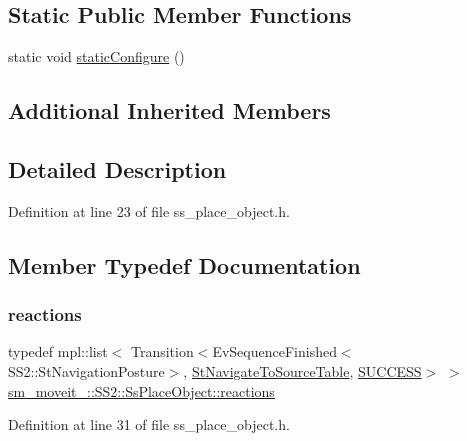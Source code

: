 \subsection*{Static Public Member Functions}
\begin{DoxyCompactItemize}
\item 
static void \hyperlink{structsm__moveit__4_1_1SS2_1_1SsPlaceObject_ad5e0cd7fc79448446fcfa5a1b3a5a35d}{static\+Configure} ()
\end{DoxyCompactItemize}
\subsection*{Additional Inherited Members}


\subsection{Detailed Description}


Definition at line 23 of file ss\+\_\+place\+\_\+object.\+h.



\subsection{Member Typedef Documentation}
\mbox{\label{structsm__moveit__4_1_1SS2_1_1SsPlaceObject_a29affbd63b59aef96edfcc2bd38075e8}} 
\subsubsection{\texorpdfstring{reactions}{reactions}}
{\footnotesize\ttfamily typedef mpl\+::list$<$ Transition$<$Ev\+Sequence\+Finished$<$S\+S2\+::\+St\+Navigation\+Posture$>$, \hyperlink{structsm__moveit__4_1_1StNavigateToSourceTable}{St\+Navigate\+To\+Source\+Table}, \hyperlink{classSUCCESS}{S\+U\+C\+C\+E\+SS}$>$ $>$ \hyperlink{structsm__moveit__4_1_1SS2_1_1SsPlaceObject_a29affbd63b59aef96edfcc2bd38075e8}{sm\+\_\+moveit\+\_\+::\+S\+S2\+::\+Ss\+Place\+Object\+::reactions}}



Definition at line 31 of file ss\+\_\+place\+\_\+object.\+h.



